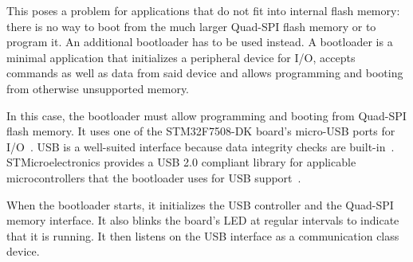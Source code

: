 This poses a problem for applications that do not fit into internal flash memory: there is no way to
boot from the much larger Quad-SPI flash memory or to program it. An additional bootloader has to be
used instead. A bootloader is a minimal application that initializes a peripheral device for I/O,
accepts commands as well as data from said device and allows programming and booting from otherwise
unsupported memory.

In this case, the bootloader must allow programming and booting from Quad-SPI flash memory. It uses
one of the STM32F7508-DK board's micro-USB ports for I/O~\cite{board-user-manual}. USB is a well-suited
interface because data integrity checks are built-in~\cite{usb-2-spec}. STMicroelectronics
provides a USB 2.0 compliant library for applicable microcontrollers that the bootloader uses for
USB support~\cite{stm32-usb-lib}.

When the bootloader starts, it initializes the USB controller and the Quad-SPI memory interface. It
also blinks the board's LED at regular intervals to indicate that it is running. It then listens on
the USB interface as a communication class device.

